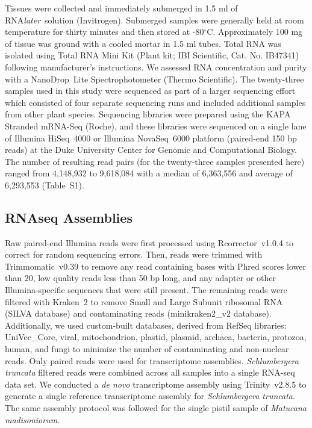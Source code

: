 \documentclass[11pt,letterpaper,titlepage]{article}
\begin{document}
\begin{linenumbers}
Tissues were collected and immediately submerged in 1.5 ml of RNA\textit{later}\texttrademark~solution (Invitrogen).
Submerged samples were generally held at room temperature for thirty minutes and then stored at -80$^{\circ}$C.
Approximately 100 mg of tissue was ground with a cooled mortar in 1.5 ml tubes.
Total RNA was isolated using Total RNA Mini Kit (Plant kit; IBI Scientific, Cat. No. IB47341) following manufacturer's instructions.
We assessed RNA concentration and purity with a NanoDrop\texttrademark~Lite Spectrophotometer (Thermo Scientific).
The twenty-three samples used in this study were sequenced as part of a larger sequencing effort which consisted of four separate sequencing runs and included additional samples from other plant species.
Sequencing libraries were prepared using the KAPA Stranded mRNA-Seq (Roche), and these libraries were sequenced on a single lane of Illumina \mbox{HiSeq}~4000 or Illumina \mbox{NovaSeq}~6000 platform (paired-end 150 bp reads) at the Duke University Center for Genomic and Computational Biology.
The number of resulting read pairs (for the twenty-three samples presented here) ranged from 4,148,932 to 9,618,084 with a median of 6,363,556 and average of 6,293,553 (Table~S1).

\subsection*{RNAseq Assemblies}

Raw paired-end Illumina reads were first processed using \mbox{Rcorrector}~v1.0.4 \cite{song2015} to correct for random sequencing errors.
Then, reads were trimmed with \mbox{Trimmomatic}~v0.39 \cite{bolger2014} to remove any read containing bases with Phred scores lower than 20, low quality reads less than 50 bp long, and any adapter or other Illumina-specific sequences that were still present.
The remaining reads were filtered with \mbox{Kraken}~2 \cite{wood2019} to remove Small and Large Subunit ribosomal RNA (SILVA database) \cite{quast2013} and contaminating reads (minikraken2\_v2 database).
Additionally, we used custom-built databases, derived from RefSeq libraries: UniVec\_Core, viral, mitochondrion, plastid, plasmid, archaea, bacteria, protozoa, human, and fungi to minimize the number of contaminating and non-nuclear reads.
Only paired reads were used for transcriptome assemblies.
\textit{Schlumbergera truncata} filtered reads were combined across all samples into a single RNA-seq data set.
We conducted a \textit{de novo} transcriptome assembly using \mbox{Trinity}~v2.8.5 \cite{grabherr2011} to generate a single reference transcriptome assembly for \textit{Schlumbergera truncata}.
The same assembly protocol was followed for the single pistil sample of \textit{Matucana madisoniorum}.


\end{linenumbers}
\end{document}
